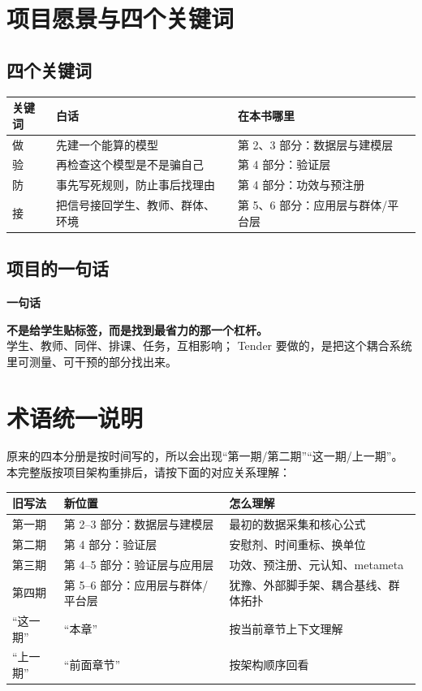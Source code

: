 \documentclass[UTF8,a4paper,11pt]{ctexart}
\newenvironment{explainbox}[1]
{\begin{center}\begin{minipage}{0.94\textwidth}\colorbox{boxbg}{\parbox{0.92\textwidth}{\textbf{#1}\par\vspace{2pt}}}}
{\end{minipage}\end{center}}
\begin{document}
\section{项目愿景与四个关键词}

\subsection{四个关键词}

\begin{center}
\begin{longtable}{@{}p{2.2cm}p{4.0cm}p{8.4cm}@{}}
\toprule
\textbf{关键词} & \textbf{白话} & \textbf{在本书哪里} \\
\midrule
做 & 先建一个能算的模型 & 第 2、3 部分：数据层与建模层 \\
验 & 再检查这个模型是不是骗自己 & 第 4 部分：验证层 \\
防 & 事先写死规则，防止事后找理由 & 第 4 部分：功效与预注册 \\
接 & 把信号接回学生、教师、群体、环境 & 第 5、6 部分：应用层与群体/平台层 \\
\bottomrule
\end{longtable}
\end{center}

\subsection{项目的一句话}

\begin{explainbox}{一句话}
\textbf{不是给学生贴标签，而是找到最省力的那一个杠杆。}\\
学生、教师、同伴、排课、任务，互相影响；
Tender 要做的，是把这个耦合系统里可测量、可干预的部分找出来。
\end{explainbox}

\section{术语统一说明}

原来的四本分册是按时间写的，所以会出现“第一期/第二期”“这一期/上一期”。
本完整版按项目架构重排后，请按下面的对应关系理解：

\begin{center}
\begin{longtable}{@{}p{4.2cm}p{4.4cm}p{6.2cm}@{}}
\toprule
\textbf{旧写法} & \textbf{新位置} & \textbf{怎么理解} \\
\midrule
第一期 & 第 2--3 部分：数据层与建模层 & 最初的数据采集和核心公式 \\
第二期 & 第 4 部分：验证层 & 安慰剂、时间重标、换单位 \\
第三期 & 第 4--5 部分：验证层与应用层 & 功效、预注册、元认知、metameta \\
第四期 & 第 5--6 部分：应用层与群体/平台层 & 犹豫、外部脚手架、耦合基线、群体拓扑 \\
“这一期” & “本章” & 按当前章节上下文理解 \\
“上一期” & “前面章节” & 按架构顺序回看 \\
\bottomrule
\end{longtable}
\end{center}
\end{document}
